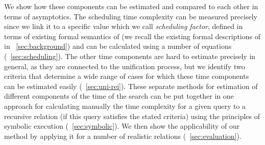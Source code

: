 We show how these components can be estimated and compared to each other in terms of asymptotics. The scheduling time complexity can be measured precisely since we link it to a specific value which we
call \emph{scheduling factor}, defined in terms of existing formal semantics of \mK (we recall the existing formal descriptions of \mK in \sectionword~\ref{sec:background}) and can be calculated using
a number of equations (\sectionword~\ref{sec:scheduling}). The other time components are hard to estimate precisely in general, as they are connected to the unification process, but we identify two
criteria that determine a wide range of cases for which these time components can be estimated easily (\sectionword~\ref{sec:uni-rei}). These separate methods for estimation of
different components of the time of the search can be put together in one approach for calculating manually the time complexity for a given query to a recursive relation (if this query satisfies the stated
criteria) using the principles of symbolic execution (\sectionword~\ref{sec:symbolic}). We then show the applicability of our method by applying it for a number of realistic \mK relations (\sectionword~\ref{sec:evaluation}).

